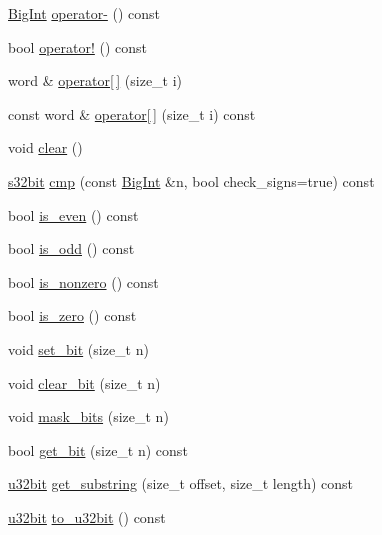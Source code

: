 \begin{DoxyCompactItemize}
\item 
\hyperlink{classBotan_1_1BigInt}{Big\-Int} \hyperlink{classBotan_1_1BigInt_a181c6d29ca728b2f90bea1f143cef773}{operator-\/} () const 
\item 
bool \hyperlink{classBotan_1_1BigInt_a39ffe5360793d18c6e2617d6c4a77b0b}{operator!} () const 
\item 
word \& \hyperlink{classBotan_1_1BigInt_ae05ecce2f6cf7aeb2e0ec377f5ed9047}{operator\mbox{[}$\,$\mbox{]}} (size\-\_\-t i)
\item 
const word \& \hyperlink{classBotan_1_1BigInt_a9dcc2704aad295f0bc31dc8c52493527}{operator\mbox{[}$\,$\mbox{]}} (size\-\_\-t i) const 
\item 
void \hyperlink{classBotan_1_1BigInt_ab9a19f7f6b7f4651b741ebf754de56ba}{clear} ()
\item 
\hyperlink{namespaceBotan_a28e03d327abd4d5b1e7091e8d80d5cfe}{s32bit} \hyperlink{classBotan_1_1BigInt_a532079ef41c702f697ddcec8fa99cb74}{cmp} (const \hyperlink{classBotan_1_1BigInt}{Big\-Int} \&n, bool check\-\_\-signs=true) const 
\item 
bool \hyperlink{classBotan_1_1BigInt_a9afa81442267f63613eac2146fdb1caa}{is\-\_\-even} () const 
\item 
bool \hyperlink{classBotan_1_1BigInt_a9cc245a42e3a0519973e4bf7d8c59354}{is\-\_\-odd} () const 
\item 
bool \hyperlink{classBotan_1_1BigInt_a63da6a139bb8e3dc615adadca1f89a99}{is\-\_\-nonzero} () const 
\item 
bool \hyperlink{classBotan_1_1BigInt_a5aeeb4e782bfe2f59797d1999af17d7d}{is\-\_\-zero} () const 
\item 
void \hyperlink{classBotan_1_1BigInt_a8ee9741893f91b27385b36ff4a0d1407}{set\-\_\-bit} (size\-\_\-t n)
\item 
void \hyperlink{classBotan_1_1BigInt_abee107903b090f5d29e525c8008fbd2e}{clear\-\_\-bit} (size\-\_\-t n)
\item 
void \hyperlink{classBotan_1_1BigInt_a95d8f43a2d1a46d97699198f99a7fc4a}{mask\-\_\-bits} (size\-\_\-t n)
\item 
bool \hyperlink{classBotan_1_1BigInt_a3eb33b6572f2b8f44fae222bc6265b6b}{get\-\_\-bit} (size\-\_\-t n) const 
\item 
\hyperlink{namespaceBotan_aacc7d03c95e97e76168fc1c819031830}{u32bit} \hyperlink{classBotan_1_1BigInt_a127995223a2bd787386b21fdd0dc3cb6}{get\-\_\-substring} (size\-\_\-t offset, size\-\_\-t length) const 
\item 
\hyperlink{namespaceBotan_aacc7d03c95e97e76168fc1c819031830}{u32bit} \hyperlink{classBotan_1_1BigInt_aae66e54cb2e6956ff8af49e4093fe1ca}{to\-\_\-u32bit} () const 

\end{DoxyCompactItemize}
